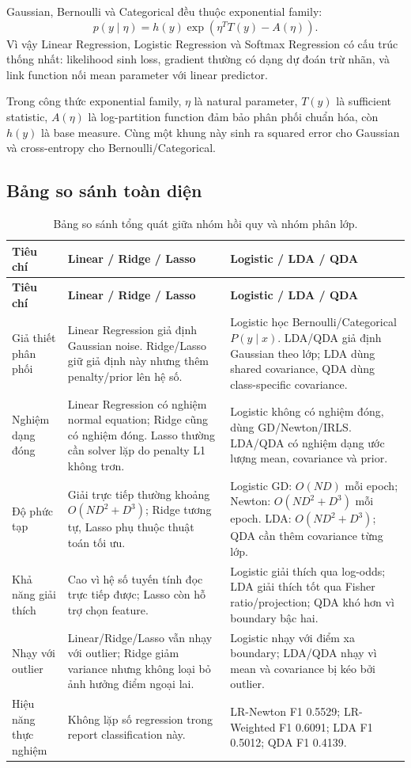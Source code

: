 \documentclass[12pt,a4paper]{article}
\begin{document}
Gaussian, Bernoulli và Categorical đều thuộc exponential family:
\begin{equation}
 p(y\mid\eta)=h(y)\exp\left(\eta^TT(y)-A(\eta)\right).
\end{equation}
Vì vậy Linear Regression, Logistic Regression và Softmax Regression có cấu trúc thống nhất: likelihood sinh loss, gradient thường có dạng dự đoán trừ nhãn, và link function nối mean parameter với linear predictor.

Trong công thức exponential family, $\eta$ là natural parameter, $T(y)$ là sufficient statistic, $A(\eta)$ là log-partition function đảm bảo phân phối chuẩn hóa, còn $h(y)$ là base measure. Cùng một khung này sinh ra squared error cho Gaussian và cross-entropy cho Bernoulli/Categorical.

\subsection{Bảng so sánh toàn diện}

\begin{longtable}{P{0.18\textwidth}P{0.37\textwidth}P{0.37\textwidth}}
\caption{Bảng so sánh tổng quát giữa nhóm hồi quy và nhóm phân lớp.}\\
\toprule
\textbf{Tiêu chí} & \textbf{Linear / Ridge / Lasso} & \textbf{Logistic / LDA / QDA} \\
\midrule
\endfirsthead
\toprule
\textbf{Tiêu chí} & \textbf{Linear / Ridge / Lasso} & \textbf{Logistic / LDA / QDA} \\
\midrule
\endhead
Giả thiết phân phối & Linear Regression giả định Gaussian noise. Ridge/Lasso giữ giả định này nhưng thêm penalty/prior lên hệ số. & Logistic học Bernoulli/Categorical $P(y\mid x)$. LDA/QDA giả định Gaussian theo lớp; LDA dùng shared covariance, QDA dùng class-specific covariance. \\
Nghiệm dạng đóng & Linear Regression có nghiệm normal equation; Ridge cũng có nghiệm đóng. Lasso thường cần solver lặp do penalty L1 không trơn. & Logistic không có nghiệm đóng, dùng GD/Newton/IRLS. LDA/QDA có nghiệm dạng ước lượng mean, covariance và prior. \\
Độ phức tạp & Giải trực tiếp thường khoảng $O(ND^2+D^3)$; Ridge tương tự, Lasso phụ thuộc thuật toán tối ưu. & Logistic GD: $O(ND)$ mỗi epoch; Newton: $O(ND^2+D^3)$ mỗi epoch. LDA: $O(ND^2+D^3)$; QDA cần thêm covariance từng lớp. \\
Khả năng giải thích & Cao vì hệ số tuyến tính đọc trực tiếp được; Lasso còn hỗ trợ chọn feature. & Logistic giải thích qua log-odds; LDA giải thích tốt qua Fisher ratio/projection; QDA khó hơn vì boundary bậc hai. \\
Nhạy với outlier & Linear/Ridge/Lasso vẫn nhạy với outlier; Ridge giảm variance nhưng không loại bỏ ảnh hưởng điểm ngoại lai. & Logistic nhạy với điểm xa boundary; LDA/QDA nhạy vì mean và covariance bị kéo bởi outlier. \\
Hiệu năng thực nghiệm & Không lặp số regression trong report classification này. & LR-Newton F1 0.5529; LR-Weighted F1 0.6091; LDA F1 0.5012; QDA F1 0.4139. \\
\bottomrule
\end{longtable}
\end{document}

